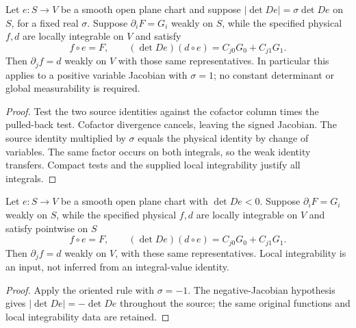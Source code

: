 \begin{lemma}
\label{lem:oriented-weak-chart}
\leanok
Let $e:S\to V$ be a smooth open plane chart and suppose
$|\det De|=\sigma\det De$ on $S$, for a fixed real $\sigma$.
Suppose $\partial_iF=G_i$ weakly on $S$, while the specified physical
$f,d$ are locally integrable on $V$ and satisfy
\[
 f\circ e=F,\qquad
 (\det De)(d\circ e)=C_{j0}G_0+C_{j1}G_1 .
\]
Then $\partial_jf=d$ weakly on $V$ with those same representatives.
In particular this applies to a positive variable Jacobian with $\sigma=1$;
no constant determinant or global measurability is required.
\end{lemma}

\begin{proof}
\leanok
Test the two source identities against the cofactor column times the
pulled-back test. Cofactor divergence cancels, leaving the signed Jacobian.
The source identity multiplied by $\sigma$ equals the physical identity by
change of variables. The same factor occurs on both integrals, so the weak
identity transfers. Compact tests and the supplied local integrability justify
all integrals.
\end{proof}

\begin{lemma}
\label{lem:negative-jacobian-weak-partial}
\leanok
Let $e:S\to V$ be a smooth open plane chart with $\det De<0$.
Suppose $\partial_iF=G_i$ weakly on $S$, while the specified physical
$f,d$ are locally integrable on $V$ and satisfy pointwise on $S$
\[
 f\circ e=F,\qquad
 (\det De)(d\circ e)=C_{j0}G_0+C_{j1}G_1.
\]
Then $\partial_jf=d$ weakly on $V$, with these same representatives.
Local integrability is an input, not inferred from an integral-value identity.
\end{lemma}

\begin{proof}
\leanok
Apply the oriented rule with $\sigma=-1$.
The negative-Jacobian hypothesis gives $|\det De|=-\det De$ throughout the source;
the same original functions and local integrability data are retained.
\end{proof}

